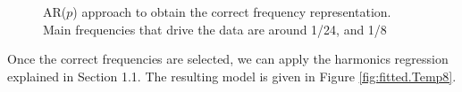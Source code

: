 \documentclass[]{article}
\begin{document}
\begin{figure}[htbp]
	\centering
	\hfill
	\caption{AR($p$) approach to obtain the correct frequency representation. Main frequencies that drive the data are around 1/24, and 1/8}
	\label{fig:spectrums_Temp8}
\end{figure}

Once the correct frequencies are selected, we can apply the harmonics regression explained in Section 1.1. The resulting model is given in Figure \ref{fig:fitted.Temp8}.
\end{document}
